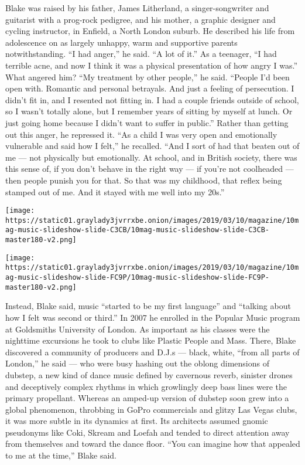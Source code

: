 Blake was raised by his father, James Litherland, a singer-songwriter
and guitarist with a prog-rock pedigree, and his mother, a graphic
designer and cycling instructor, in Enfield, a North London suburb. He
described his life from adolescence on as largely unhappy, warm and
supportive parents notwithstanding. ``I had anger,'' he said. ``A lot of
it.'' As a teenager, ``I had terrible acne, and now I think it was a
physical presentation of how angry I was.'' What angered him? ``My
treatment by other people,'' he said. ``People I'd been open with.
Romantic and personal betrayals. And just a feeling of persecution. I
didn't fit in, and I resented not fitting in. I had a couple friends
outside of school, so I wasn't totally alone, but I remember years of
sitting by myself at lunch. Or just going home because I didn't want to
suffer in public.'' Rather than getting out this anger, he repressed it.
``As a child I was very open and emotionally vulnerable and said how I
felt,'' he recalled. ``And I sort of had that beaten out of me --- not
physically but emotionally. At school, and in British society, there was
this sense of, if you don't behave in the right way --- if you're not
coolheaded --- then people punish you for that. So that was my
childhood, that reflex being stamped out of me. And it stayed with me
well into my 20s.''

\texttt{[image: https://static01.graylady3jvrrxbe.onion/images/2019/03/10/magazine/10mag-music-slideshow-slide-C3CB/10mag-music-slideshow-slide-C3CB-master180-v2.png]}

\texttt{[image: https://static01.graylady3jvrrxbe.onion/images/2019/03/10/magazine/10mag-music-slideshow-slide-FC9P/10mag-music-slideshow-slide-FC9P-master180-v2.png]}

Instead, Blake said, music ``started to be my first language'' and
``talking about how I felt was second or third.'' In 2007 he enrolled in
the Popular Music program at Goldsmiths University of London. As
important as his classes were the nighttime excursions he took to clubs
like Plastic People and Mass. There, Blake discovered a community of
producers and D.J.s --- black, white, ``from all parts of London,'' he
said --- who were busy hashing out the oblong dimensions of dubstep, a
new kind of dance music defined by cavernous reverb, sinister drones and
deceptively complex rhythms in which growlingly deep bass lines were the
primary propellant. Whereas an amped-up version of dubstep soon grew
into a global phenomenon, throbbing in GoPro commercials and glitzy Las
Vegas clubs, it was more subtle in its dynamics at first. Its architects
assumed gnomic pseudonyms like Coki, Skream and Loefah and tended to
direct attention away from themselves and toward the dance floor. ``You
can imagine how that appealed to me at the time,'' Blake said.

